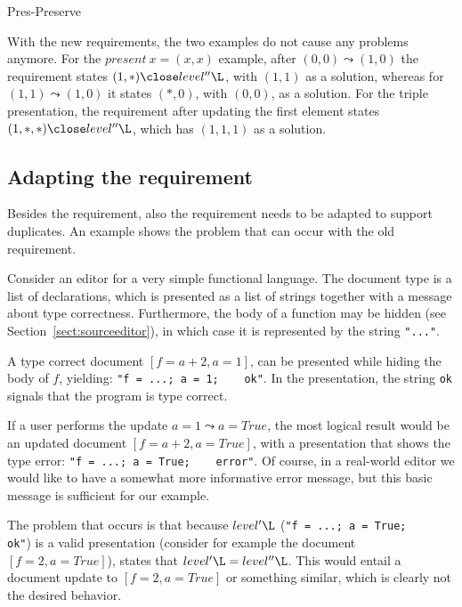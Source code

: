 	{Pres-Preserve}

With the new requirements, the two examples do not cause any problems anymore. For the $present~x = (x,x)$ example, after $(0,0) \leadsto (1,0)$ the requirement states $(1,*) \close level''\L$, with $(1,1)$ as a solution, whereas for $(1,1)\leadsto (1,0)$ it states $(*,0)$, with $(0,0)$, as a solution. For the triple presentation, the requirement after updating the first element states $(1,*,*) \close level''\L$, which has $(1,1,1)$ as a solution. 

\subsection{Adapting the  requirement}

Besides the  requirement, also the  requirement needs to be adapted to support duplicates. An example shows the problem that can occur with the old  requirement.

Consider an editor for a very simple functional language. The document type is a list of declarations, which is presented as a list of strings together with a message about type correctness. Furthermore, the body of a function may be hidden (see Section~\ref{sect:sourceeditor}), in which case it is represented by the string \verb|"..."|. 

A type correct document $[f = a+2, a = 1]$, can be presented while hiding the body of $f$, yielding: \verb|"f = ...; a = 1;    ok"|. In the presentation, the string \verb|ok| signals that the program is type correct. 

If a user performs the update $a = 1 \leadsto a = True$, the most logical result would be an updated document 
$[f = a+2, a = True]$, with a presentation that shows the type error: \verb|"f = ...; a = True;    error"|. Of course, in a real-world editor we would like to have a somewhat more informative error message, but this basic message is sufficient for our example.

The problem that occurs is that because $level'\L$ (\verb|"f = ...; a = True;    ok"|) is a valid presentation (consider for example the document  $[f = 2, a = True]$),  states that $level'\L = level''\L$. This would entail a document update to 
$[f = 2, a = True]$ or something similar, which is clearly not the desired behavior.

